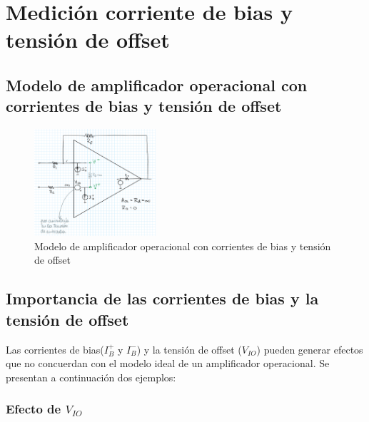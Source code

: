 \documentclass[../../main.tex]{subfiles}
\begin{document}
\section{Medici\'on corriente de bias y tensi\'on de offset}

\subsection{Modelo de amplificador operacional con corrientes de bias y tensi\'on de offset}


\begin{figure}[htb]	%
	\centering
	\includegraphics[width=0.4\textwidth]{imagenes/modelo_opamp_vio_ibias.png}
	\caption{Modelo de amplificador operacional con corrientes de bias y tensi\'on de offset}
	\label{fig:ej5_modelo_opamp_vio_ibias}
\end{figure}



\subsection{Importancia de las corrientes de bias y la tensi\'on de offset}



Las corrientes de bias($I_B^+$ y $I_B^-$) y la tensi\'on de offset ($V_{IO}$) pueden generar efectos que no concuerdan con el modelo ideal de un amplificador operacional. Se presentan a continuaci\'on dos ejemplos:

\subsubsection*{Efecto de $V_{IO}$}
\end{document}
